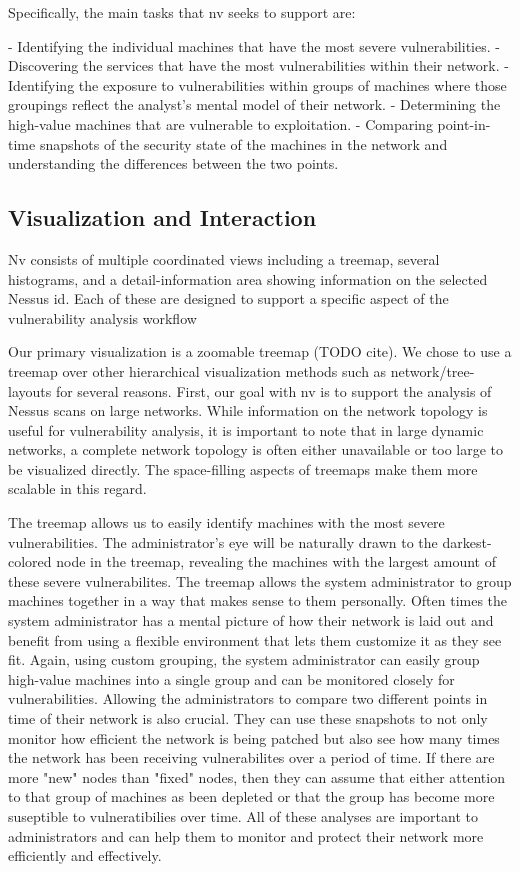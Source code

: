 \documentclass{acm_proc_article-sp}
\begin{document}
Specifically, the main tasks that nv seeks to support are:

- Identifying the individual machines that have the most severe vulnerabilities.
- Discovering the services that have the most vulnerabilities within
their network.
- Identifying the exposure to vulnerabilities within groups of
machines where those groupings reflect the analyst's mental model of
their network.
- Determining the high-value machines that are vulnerable to exploitation.
- Comparing point-in-time snapshots of the security state of the
machines in the network and understanding the differences between the
two points.

\subsection{Visualization and Interaction}
Nv consists of multiple coordinated views including a treemap, several histograms, and a detail-information area showing information on the selected Nessus id.
Each of these are designed to support a specific aspect of the vulnerability analysis workflow

Our primary visualization is a zoomable treemap (TODO cite).
We chose to use a treemap over other hierarchical visualization methods such as network/tree-layouts for several reasons.
First, our goal with nv is to support the analysis of Nessus scans on large networks.
While information on the network topology is useful for vulnerability analysis, it is important to note that in large dynamic networks, a complete network topology is often either unavailable or too large to be visualized directly.
The space-filling aspects of treemaps make them more scalable in this regard.

The treemap allows us to easily identify machines with the most severe vulnerabilities. The administrator's eye will be naturally drawn to the darkest-colored node in the treemap, revealing the machines with the largest amount of these severe vulnerabilites. The treemap allows the system administrator to group machines together in a way that makes sense to them personally. Often times the system administrator has a mental picture of how their network is laid out and benefit from using a flexible environment that lets them customize it as they see fit. Again, using custom grouping, the system administrator can easily group high-value machines into a single group and can be monitored closely for vulnerabilities. Allowing the administrators to compare two different points in time of their network is also crucial. They can use these snapshots to not only monitor how efficient the network is being patched but also see how many times the network has been receiving vulnerabilites over a period of time. If there are more "new" nodes than "fixed" nodes, then they can assume that either attention to that group of machines as been depleted or that the group has become more suseptible to vulneratibilies over time. All of these analyses are important to administrators and can help them to monitor and protect their network more efficiently and effectively.
\end{document}
